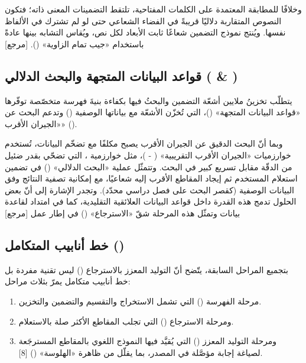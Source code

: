 وخلافًا للمطابقة المعتمدة على الكلمات المفتاحية، تلتقط التضمينات المعنى ذاته؛ فتكون النصوص المتقاربة دلاليًا قريبةً في الفضاء الشعاعي حتى لو لم تشترك في الألفاظ نفسها. ويُنتج نموذج التضمين شعاعًا ثابت الأبعاد لكل نص، ويُقاس التشابه بينها عادةً باستخدام «جيب تمام الزاوية» (). [مرجع]

\subsection{قواعد البيانات المتجهة والبحث الدلالي ( \& )}

يتطلّب تخزينُ ملايين أشعّة التضمين والبحثُ فيها بكفاءة بنيةَ فهرسة متخصّصة توفّرها «قواعد البيانات المتجهة» ()، التي تُخزّن الأشعّة مع بياناتها الوصفية () وتدعم البحث عن «الجيران الأقرب» ().

وبما أنّ البحث الدقيق عن الجيران الأقرب يصبح مكلفًا مع تضخّم البيانات، تُستخدم خوارزميات «الجيران الأقرب التقريبية» ( - )، مثل خوارزمية ، التي تضحّي بقدر ضئيل من الدقّة مقابل تسريع كبير في البحث. وتتمثّل عملية «البحث الدلالي» () في تضمين استعلام المستخدم ثم إيجاد المقاطع الأقرب إليه شعاعيًا، مع إمكانية تصفية النتائج وفق البيانات الوصفية (كقصر البحث على فصل دراسي محدّد). وتجدر الإشارة إلى أنّ بعض الحلول تدمج هذه القدرة داخل قواعد البيانات العلائقية التقليدية، كما في امتداد  لقاعدة بيانات  وتمثّل هذه المرحلة شقّ «الاسترجاع» () في إطار عمل  [مرجع]

\subsection{خط أنابيب  المتكامل ()}

بتجميع المراحل السابقة، يتّضح أنّ التوليد المعزز بالاسترجاع () ليس تقنية مفردة بل خط أنابيب متكامل يمرّ بثلاث مراحل:

\begin{enumerate}
  \item مرحلة الفهرسة () التي تشمل الاستخراج والتقسيم والتضمين والتخزين.
  \item ومرحلة الاسترجاع () التي تجلب المقاطع الأكثر صلة بالاستعلام.
  \item ومرحلة التوليد المعزز () التي يُقيَّد فيها النموذج اللغوي بالمقاطع المسترجَعة لصياغة إجابة مؤصَّلة في المصدر، بما يقلّل من ظاهرة «الهلوسة» () [8].
\end{enumerate}
